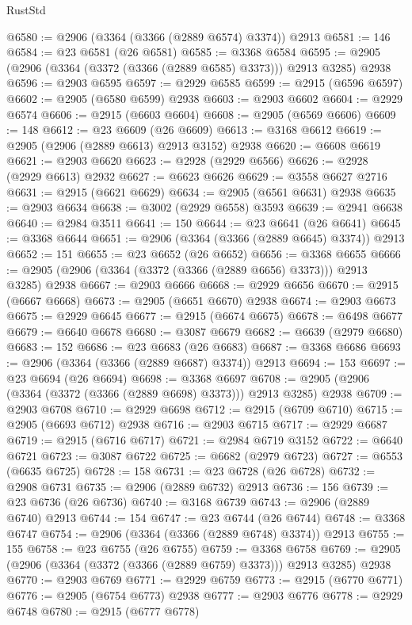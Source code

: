 \begin{lexlean}{RustStd}
\begin{coremodule}
{\begin{coremodule}
{{{{{{{{{{{{{{{{{{{{{{{{{{{{{{{{{{{{{{{{{{{{{{{{{{{{{{{{{{{{{{{{{{{{{{{{{{{{{{@6580 := @2906 (@3364 (@3366 (@2889 @6574) @3374)) @2913
@6581 := 146
@6584 := @23 @6581 (@26 @6581)
@6585 := @3368 @6584
@6595 := @2905 (@2906 (@3364 (@3372 (@3366 (@2889 @6585) @3373))) @2913 @3285) @2938
@6596 := @2903 @6595
@6597 := @2929 @6585
@6599 := @2915 (@6596 @6597)
@6602 := @2905 (@6580 @6599) @2938
@6603 := @2903 @6602
@6604 := @2929 @6574
@6606 := @2915 (@6603 @6604)
@6608 := @2905 (@6569 @6606)
@6609 := 148
@6612 := @23 @6609 (@26 @6609)
@6613 := @3168 @6612
@6619 := @2905 (@2906 (@2889 @6613) @2913 @3152) @2938
@6620 := @6608 @6619
@6621 := @2903 @6620
@6623 := @2928 (@2929 @6566)
@6626 := @2928 (@2929 @6613) @2932
@6627 := @6623 @6626
@6629 := @3558 @6627 @2716
@6631 := @2915 (@6621 @6629)
@6634 := @2905 (@6561 @6631) @2938
@6635 := @2903 @6634
@6638 := @3002 (@2929 @6558) @3593
@6639 := @2941 @6638
@6640 := @2984 @3511
@6641 := 150
@6644 := @23 @6641 (@26 @6641)
@6645 := @3368 @6644
@6651 := @2906 (@3364 (@3366 (@2889 @6645) @3374)) @2913
@6652 := 151
@6655 := @23 @6652 (@26 @6652)
@6656 := @3368 @6655
@6666 := @2905 (@2906 (@3364 (@3372 (@3366 (@2889 @6656) @3373))) @2913 @3285) @2938
@6667 := @2903 @6666
@6668 := @2929 @6656
@6670 := @2915 (@6667 @6668)
@6673 := @2905 (@6651 @6670) @2938
@6674 := @2903 @6673
@6675 := @2929 @6645
@6677 := @2915 (@6674 @6675)
@6678 := @6498 @6677
@6679 := @6640 @6678
@6680 := @3087 @6679
@6682 := @6639 (@2979 @6680)
@6683 := 152
@6686 := @23 @6683 (@26 @6683)
@6687 := @3368 @6686
@6693 := @2906 (@3364 (@3366 (@2889 @6687) @3374)) @2913
@6694 := 153
@6697 := @23 @6694 (@26 @6694)
@6698 := @3368 @6697
@6708 := @2905 (@2906 (@3364 (@3372 (@3366 (@2889 @6698) @3373))) @2913 @3285) @2938
@6709 := @2903 @6708
@6710 := @2929 @6698
@6712 := @2915 (@6709 @6710)
@6715 := @2905 (@6693 @6712) @2938
@6716 := @2903 @6715
@6717 := @2929 @6687
@6719 := @2915 (@6716 @6717)
@6721 := @2984 @6719 @3152
@6722 := @6640 @6721
@6723 := @3087 @6722
@6725 := @6682 (@2979 @6723)
@6727 := @6553 (@6635 @6725)
@6728 := 158
@6731 := @23 @6728 (@26 @6728)
@6732 := @2908 @6731
@6735 := @2906 (@2889 @6732) @2913
@6736 := 156
@6739 := @23 @6736 (@26 @6736)
@6740 := @3168 @6739
@6743 := @2906 (@2889 @6740) @2913
@6744 := 154
@6747 := @23 @6744 (@26 @6744)
@6748 := @3368 @6747
@6754 := @2906 (@3364 (@3366 (@2889 @6748) @3374)) @2913
@6755 := 155
@6758 := @23 @6755 (@26 @6755)
@6759 := @3368 @6758
@6769 := @2905 (@2906 (@3364 (@3372 (@3366 (@2889 @6759) @3373))) @2913 @3285) @2938
@6770 := @2903 @6769
@6771 := @2929 @6759
@6773 := @2915 (@6770 @6771)
@6776 := @2905 (@6754 @6773) @2938
@6777 := @2903 @6776
@6778 := @2929 @6748
@6780 := @2915 (@6777 @6778)
}}}}}}}}}}}}}}}}}}}}}}}}}}}}}}}}}}}}}}}}}}}}}}}}}}}}}}}}}}}}}}}}}}}}}}}}}}}}}}
\end{coremodule}}
\end{coremodule}
\end{lexlean}
